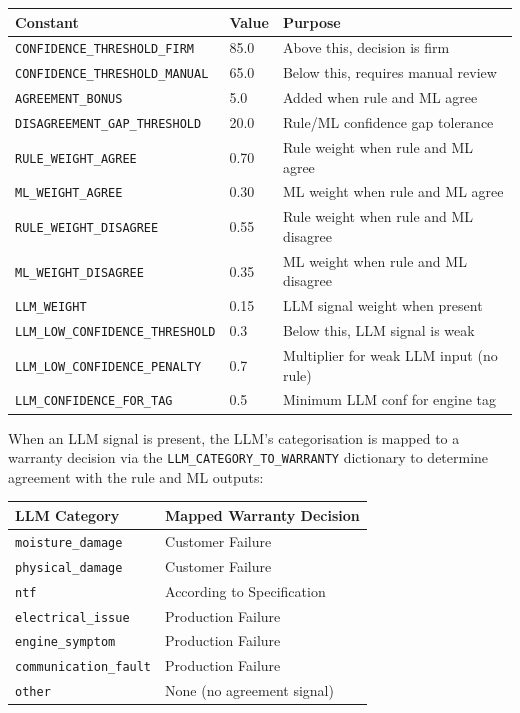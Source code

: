 \documentclass[10pt]{article}
\begin{document}
\begin{table}[h!]
\centering
\begin{tabular}{|p{5.5cm}|p{2cm}|p{5.5cm}|}
\hline
\textbf{Constant} & \textbf{Value} & \textbf{Purpose} \\ \hline
\texttt{CONFIDENCE\_THRESHOLD\_FIRM} & 85.0 & Above this, decision is firm \\ \hline
\texttt{CONFIDENCE\_THRESHOLD\_MANUAL} & 65.0 & Below this, requires manual review \\ \hline
\texttt{AGREEMENT\_BONUS} & 5.0 & Added when rule and ML agree \\ \hline
\texttt{DISAGREEMENT\_GAP\_THRESHOLD} & 20.0 & Rule/ML confidence gap tolerance \\ \hline
\texttt{RULE\_WEIGHT\_AGREE} & 0.70 & Rule weight when rule and ML agree \\ \hline
\texttt{ML\_WEIGHT\_AGREE} & 0.30 & ML weight when rule and ML agree \\ \hline
\texttt{RULE\_WEIGHT\_DISAGREE} & 0.55 & Rule weight when rule and ML disagree \\ \hline
\texttt{ML\_WEIGHT\_DISAGREE} & 0.35 & ML weight when rule and ML disagree \\ \hline
\texttt{LLM\_WEIGHT} & 0.15 & LLM signal weight when present \\ \hline
\texttt{LLM\_LOW\_CONFIDENCE\_THRESHOLD} & 0.3 & Below this, LLM signal is weak \\ \hline
\texttt{LLM\_LOW\_CONFIDENCE\_PENALTY} & 0.7 & Multiplier for weak LLM input (no rule) \\ \hline
\texttt{LLM\_CONFIDENCE\_FOR\_TAG} & 0.5 & Minimum LLM conf for engine tag \\ \hline
\end{tabular}
\end{table}

When an LLM signal is present, the LLM's categorisation is mapped to a warranty decision via the \texttt{LLM\_CATEGORY\_TO\_WARRANTY} dictionary to determine agreement with the rule and ML outputs:

\begin{table}[h!]
\centering
\begin{tabular}{|p{4cm}|p{9cm}|}
\hline
\textbf{LLM Category} & \textbf{Mapped Warranty Decision} \\ \hline
\texttt{moisture\_damage} & Customer Failure \\ \hline
\texttt{physical\_damage} & Customer Failure \\ \hline
\texttt{ntf} & According to Specification \\ \hline
\texttt{electrical\_issue} & Production Failure \\ \hline
\texttt{engine\_symptom} & Production Failure \\ \hline
\texttt{communication\_fault} & Production Failure \\ \hline
\texttt{other} & None (no agreement signal) \\ \hline
\end{tabular}
\end{table}
\end{document}
